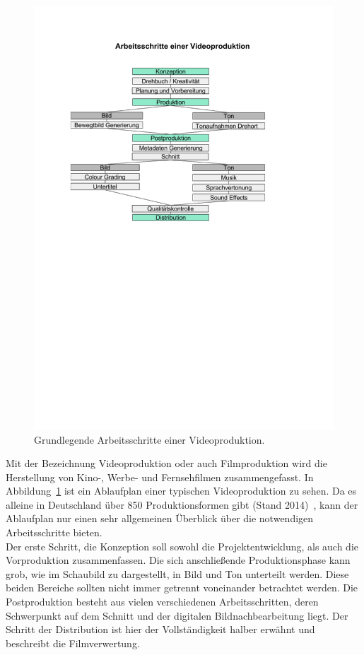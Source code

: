 \documentclass[times, 11pt,twocolumn]{article}
\begin{document}
 \label{sec:Videoproduktion} 
\begin{figure}
	\flushleft
	\includegraphics[width=\columnwidth, trim = 20mm 145mm 45mm 40mm, clip]{Bilder/ArbeitsschritteVideoproduktion.pdf}
	\caption{Grundlegende Arbeitsschritte einer Videoproduktion.}
	\label{fig:Videoproduktion}
\end{figure}
Mit der Bezeichnung Videoproduktion oder auch Filmproduktion wird die Herstellung von Kino-, Werbe- und Fernsehfilmen zusammengefasst. In Abbildung~\ref{fig:Videoproduktion} ist ein Ablaufplan einer typischen Videoproduktion zu sehen. Da es alleine in Deutschland über 850 Produktionsformen gibt (Stand 2014)~\cite{formatt}, kann der Ablaufplan nur einen sehr allgemeinen Überblick über die notwendigen Arbeitsschritte bieten. \\
Der erste Schritt, die Konzeption soll sowohl die Projektentwicklung, als auch die Vorproduktion zusammenfassen. Die sich anschließende Produktionsphase kann grob, wie im Schaubild zu dargestellt, in Bild und Ton unterteilt werden. Diese beiden Bereiche sollten nicht immer getrennt voneinander betrachtet werden. Die Postproduktion besteht aus vielen verschiedenen Arbeitsschritten, deren Schwerpunkt auf dem Schnitt und der digitalen Bildnachbearbeitung liegt. Der Schritt der Distribution ist hier der Vollständigkeit halber erwähnt und beschreibt die Filmverwertung. \\
\end{document}
